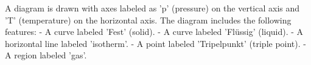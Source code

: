 A diagram is drawn with axes labeled as 'p' (pressure) on the vertical axis and 'T' (temperature) on the horizontal axis. The diagram includes the following features:  
- A curve labeled 'Fest' (solid).  
- A curve labeled 'Flüssig' (liquid).  
- A horizontal line labeled 'isotherm'.  
- A point labeled 'Tripelpunkt' (triple point).  
- A region labeled 'gas'.